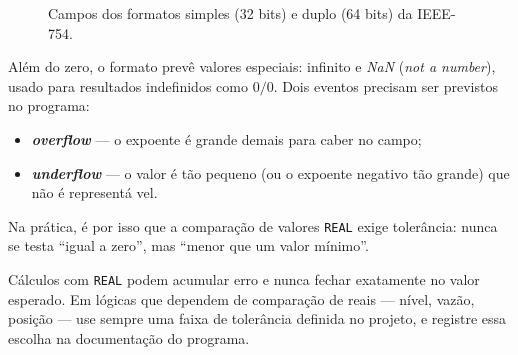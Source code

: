 \begin{figure}[H]
  \centering
  \caption{Campos dos formatos simples (32 bits) e duplo (64 bits) da IEEE-754.}
  \label{fig:ieee754}
\end{figure}

Além do zero, o formato prevê valores especiais: infinito e \emph{NaN} (\emph{not a number}),
usado para resultados indefinidos como $0/0$. Dois eventos precisam ser previstos no programa:

\begin{itemize}
  \item \textbf{\emph{overflow}} --- o expoente é grande demais para caber no campo;
  \item \textbf{\emph{underflow}} --- o valor é tão pequeno (ou o expoente negativo tão grande) que
        não é representá vel.
\end{itemize}

Na prática, é por isso que a comparação de valores \texttt{REAL} exige tolerância: nunca se testa
``igual a zero'', mas ``menor que um valor mínimo''.

\begin{atencao}
Cálculos com \texttt{REAL} podem acumular erro e nunca fechar exatamente no valor esperado. Em
lógicas que dependem de comparação de reais --- nível, vazão, posição --- use sempre uma faixa de
tolerância definida no projeto, e registre essa escolha na documentação do programa.
\end{atencao}

